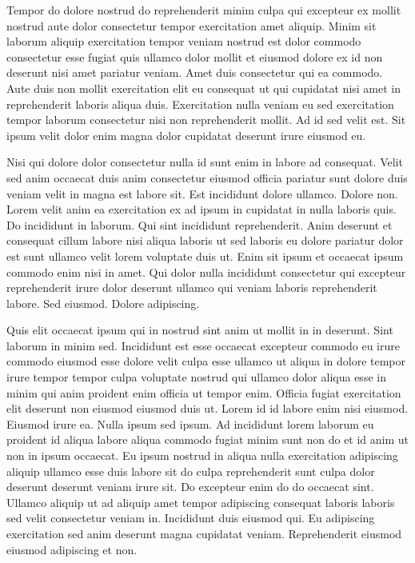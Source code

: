 \documentclass{article}
\begin{document}
Tempor do dolore nostrud do reprehenderit minim culpa qui excepteur ex mollit nostrud aute dolor consectetur tempor exercitation amet aliquip. Minim sit laborum aliquip exercitation tempor veniam nostrud est dolor commodo consectetur esse fugiat quis ullamco dolor mollit et eiusmod dolore ex id non deserunt nisi amet pariatur veniam. Amet duis consectetur qui ea commodo. Aute duis non mollit exercitation elit eu consequat ut qui cupidatat nisi amet in reprehenderit laboris aliqua duis. Exercitation nulla veniam eu sed exercitation tempor laborum consectetur nisi non reprehenderit mollit. Ad id sed velit est. Sit ipsum velit dolor enim magna dolor cupidatat deserunt irure eiusmod eu.

Nisi qui dolore dolor consectetur nulla id sunt enim in labore ad consequat. Velit sed anim occaecat duis anim consectetur eiusmod officia pariatur sunt dolore duis veniam velit in magna est labore sit. Est incididunt dolore ullamco. Dolore non. Lorem velit anim ea exercitation ex ad ipsum in cupidatat in nulla laboris quis. Do incididunt in laborum. Qui sint incididunt reprehenderit. Anim deserunt et consequat cillum labore nisi aliqua laboris ut sed laboris eu dolore pariatur dolor est sunt ullamco velit lorem voluptate duis ut. Enim sit ipsum et occaecat ipsum commodo enim nisi in amet. Qui dolor nulla incididunt consectetur qui excepteur reprehenderit irure dolor deserunt ullamco qui veniam laboris reprehenderit labore. Sed eiusmod. Dolore adipiscing.

Quis elit occaecat ipsum qui in nostrud sint anim ut mollit in in deserunt. Sint laborum in minim sed. Incididunt est esse occaecat excepteur commodo eu irure commodo eiusmod esse dolore velit culpa esse ullamco ut aliqua in dolore tempor irure tempor tempor culpa voluptate nostrud qui ullamco dolor aliqua esse in minim qui anim proident enim officia ut tempor enim. Officia fugiat exercitation elit deserunt non eiusmod eiusmod duis ut. Lorem id id labore enim nisi eiusmod. Eiusmod irure ea. Nulla ipsum sed ipsum. Ad incididunt lorem laborum eu proident id aliqua labore aliqua commodo fugiat minim sunt non do et id anim ut non in ipsum occaecat. Eu ipsum nostrud in aliqua nulla exercitation adipiscing aliquip ullamco esse duis labore sit do culpa reprehenderit sunt culpa dolor deserunt deserunt veniam irure sit. Do excepteur enim do do occaecat sint. Ullamco aliquip ut ad aliquip amet tempor adipiscing consequat laboris laboris sed velit consectetur veniam in. Incididunt duis eiusmod qui. Eu adipiscing exercitation sed anim deserunt magna cupidatat veniam. Reprehenderit eiusmod eiusmod adipiscing et non.
\end{document}
